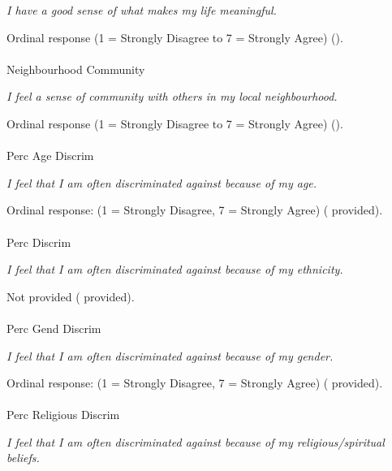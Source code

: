 \documentclass[
  single column]{article}
\makeatletter
\let\oldparagraph\paragraph
\renewcommand{\paragraph}{
    \@ifstar
      \xxxParagraphStar
      \xxxParagraphNoStar
  }
\newcommand{\xxxParagraphStar}[1]{\oldparagraph*{#1}\mbox{}}
\newcommand{\xxxParagraphNoStar}[1]{\oldparagraph{#1}\mbox{}}
\makeatother
\begin{document}
\emph{I have a good sense of what makes my life meaningful.}

Ordinal response (1 = Strongly Disagree to 7 = Strongly Agree)
().

\paragraph{Neighbourhood Community}\label{neighbourhood-community}

\emph{I feel a sense of community with others in my local
neighbourhood.}

Ordinal response (1 = Strongly Disagree to 7 = Strongly Agree)
().

\paragraph{Perc Age Discrim}\label{perc-age-discrim}

\emph{I feel that I am often discriminated against because of my age.}

Ordinal response: (1 = Strongly Disagree, 7 = Strongly Agree)
( provided).

\paragraph{Perc Discrim}\label{perc-discrim}

\emph{I feel that I am often discriminated against because of my
ethnicity.}

Not provided ( provided).

\paragraph{Perc Gend Discrim}\label{perc-gend-discrim}

\emph{I feel that I am often discriminated against because of my
gender.}

Ordinal response: (1 = Strongly Disagree, 7 = Strongly Agree)
( provided).

\paragraph{Perc Religious Discrim}\label{perc-religious-discrim}

\emph{I feel that I am often discriminated against because of my
religious/spiritual beliefs.}
\end{document}
